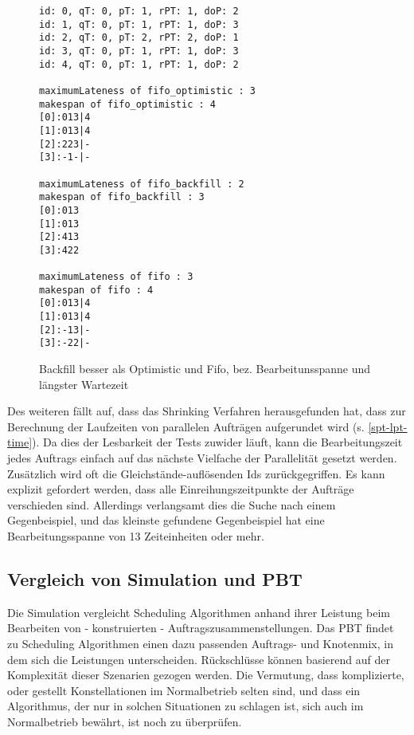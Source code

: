\begin{figure}
	\centering
	\begin{verbatim}
id: 0, qT: 0, pT: 1, rPT: 1, doP: 2
id: 1, qT: 0, pT: 1, rPT: 1, doP: 3
id: 2, qT: 0, pT: 2, rPT: 2, doP: 1
id: 3, qT: 0, pT: 1, rPT: 1, doP: 3
id: 4, qT: 0, pT: 1, rPT: 1, doP: 2

maximumLateness of fifo_optimistic : 3
makespan of fifo_optimistic : 4
[0]:013|4
[1]:013|4
[2]:223|-
[3]:-1-|-

maximumLateness of fifo_backfill : 2
makespan of fifo_backfill : 3
[0]:013
[1]:013
[2]:413
[3]:422

maximumLateness of fifo : 3
makespan of fifo : 4
[0]:013|4
[1]:013|4
[2]:-13|-
[3]:-22|-
\end{verbatim}
\caption{Backfill besser als Optimistic und Fifo, bez. Bearbeitunsspanne und längster Wartezeit}
\label{everything}
\end{figure}

Des weiteren fällt auf, dass das Shrinking Verfahren herausgefunden hat, dass zur Berechnung der Laufzeiten von parallelen Aufträgen aufgerundet wird (s. \ref{spt-lpt-time}). Da dies der Lesbarkeit der Tests zuwider läuft, kann die Bearbeitungszeit jedes Auftrags einfach auf das nächste Vielfache der Parallelität gesetzt werden.
Zusätzlich wird oft die Gleichstände-auflösenden Ids zurückgegriffen. Es kann explizit gefordert werden, dass alle Einreihungszeitpunkte der Aufträge verschieden sind. Allerdings verlangsamt dies die Suche nach einem Gegenbeispiel, und das kleinste gefundene Gegenbeispiel hat eine Bearbeitungsspanne von 13 Zeiteinheiten oder mehr.\\
\FloatBarrier

\subsection{Vergleich von Simulation und PBT}
\label{prop-sim}
Die Simulation vergleicht Scheduling Algorithmen anhand ihrer Leistung beim Bearbeiten von -  konstruierten - Auftragszusammenstellungen. Das PBT findet zu Scheduling Algorithmen einen dazu passenden Auftrags- und Knotenmix, in dem sich die Leistungen unterscheiden. Rückschlüsse können basierend auf der Komplexität dieser Szenarien gezogen werden. Die Vermutung, dass komplizierte, oder gestellt Konstellationen im Normalbetrieb selten sind, und dass ein Algorithmus, der nur in solchen Situationen zu schlagen ist, sich auch im Normalbetrieb bewährt, ist noch zu überprüfen.\\


